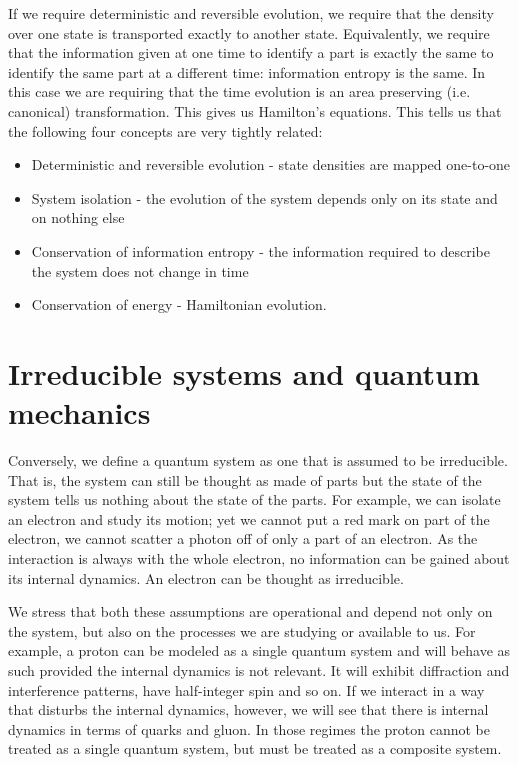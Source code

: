 \documentclass{article}
\begin{document}
If we require deterministic and reversible evolution, we require that the density over one state is transported exactly to another state. Equivalently, we require that the information given at one time to identify a part is exactly the same to identify the same part at a different time: information entropy is the same. In this case we are requiring that the time evolution is an area preserving (i.e. canonical) transformation. This gives us Hamilton's equations. This tells us that the following four concepts are very tightly related:
\begin{itemize}
	\item Deterministic and reversible evolution - state densities are mapped one-to-one
	\item System isolation - the evolution of the system depends only on its state and on nothing else
	\item Conservation of information entropy - the information required to describe the system does not change in time
	\item Conservation of energy - Hamiltonian evolution.
\end{itemize}

\section{Irreducible systems and quantum mechanics}

Conversely, we define a quantum system as one that is assumed to be irreducible. That is, the system can still be thought as made of parts but the state of the system tells us nothing about the state of the parts. For example, we can isolate an electron and study its motion; yet we cannot put a red mark on part of the electron, we cannot scatter a photon off of only a part of an electron. As the interaction is always with the whole electron, no information can be gained about its internal dynamics. An electron can be thought as irreducible.

We stress that both these assumptions are operational and depend not only on the system, but also on the processes we are studying or available to us. For example, a proton can be modeled as a single quantum system and will behave as such provided the internal dynamics is not relevant. It will exhibit diffraction and interference patterns, have half-integer spin and so on. If we interact in a way that disturbs the internal dynamics, however, we will see that there is internal dynamics in terms of quarks and gluon. In those regimes the proton cannot be treated as a single quantum system, but must be treated as a composite system.
\end{document}
